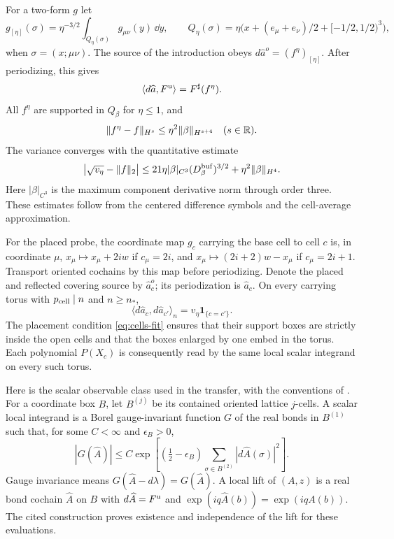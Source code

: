 For a two-form $g$ let
\[
 g_{[\eta]}(\sigma)=\eta^{-3/2}
        \int_{Q_\eta(\sigma)}g_{\mu\nu}(y)\,\dd y,\qquad
 Q_\eta(\sigma)=\eta\bigl(x+(e_\mu+e_\nu)/2+[-1/2,1/2)^3\bigr),
\]
when $\sigma=(x;\mu\nu)$. The source of the introduction obeys
$d\widehat a^o=(f^\eta)_{[\eta]}$.
After periodizing, this gives
\[
 \langle d\widehat a,F^{\rm u}\rangle=F^\sharp(f^\eta).
\]
All $f^\eta$ are supported in $Q_\beta$ for $\eta\le1$, and
\begin{equation}\label{eq:cells-test-error}
 \|f^\eta-f\|_{H^s}\le\eta^2\|\beta\|_{H^{s+4}}
                       \quad(s\in\mathbb R).
\end{equation}
The variance converges with the quantitative estimate
\begin{equation}\label{eq:cells-variance-limit}
 \left|\sqrt{v_\eta}-\|f\|_2\right|
 \le21\eta|\beta|_{C^3}(D_\beta^{\rm buf})^{3/2}
                       +\eta^2\|\beta\|_{H^4}.
\end{equation}
Here $|\beta|_{C^3}$ is the maximum component derivative norm
through order three. These estimates follow from the centered
difference symbols and the cell-average approximation.

For the placed probe, the coordinate map $g_c$ carrying the
base cell to cell $c$ is, in coordinate $\mu$,
$x_\mu\mapsto x_\mu+2iw$ if $c_\mu=2i$, and
$x_\mu\mapsto(2i+2)w-x_\mu$ if $c_\mu=2i+1$.
Transport oriented cochains by this map before periodizing.
Denote the placed and reflected covering source by
$\widehat a_c^o$; its periodization is $\widehat a_c$.
On every carrying torus with $p_{\rm cell}\mid n$ and $n\ge n_*$,
\begin{equation}\label{eq:cells-orthogonality}
 \langle d\widehat a_c,d\widehat a_{c'}\rangle_n
                         =v_\eta\mathbf1_{\{c=c'\}}.
\end{equation}
The placement condition \eqref{eq:cells-fit} ensures that their
support boxes are strictly inside the open cells and that the
boxes enlarged by one embed in the torus.
Each polynomial $P(X_c)$ is consequently read by the same
local scalar integrand on every such torus.

Here is the scalar observable class used in the transfer,
with the conventions of \cite[\S4.1, (46)--(50)]{ChamberLattice}.
For a coordinate box $B$, let $B^{(j)}$ be its contained
oriented lattice $j$-cells. A scalar local integrand is a Borel
gauge-invariant function $G$ of the real bonds in $B^{(1)}$
such that, for some $C<\infty$ and $\epsilon_B>0$,
\[
 |G(\widehat A)|\le C\exp\left[
   (\tfrac12-\epsilon_B)
          \sum_{\sigma\in B^{(2)}}|d\widehat A(\sigma)|^2\right].
\]
Gauge invariance means $G(\widehat A-d\lambda)=G(\widehat A)$.
A local lift of $(A,z)$ is a real bond cochain $\widehat A$
on $B$ with $d\widehat A=F^{\rm u}$ and
$\exp(iq\widehat A(b))=\exp(iqA(b))$.
The cited construction proves existence and independence of
the lift for these evaluations.

